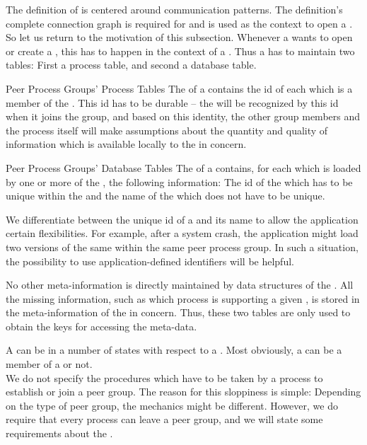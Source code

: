 \documentclass[a4paper, 12pt]{book}
\begin{document}
The definition of  is centered around communication
patterns. The definition's complete connection graph is required for
and is used as the context to open a . So let us return
to the motivation of this subsection. Whenever a  wants to
open or create a , this has to happen in the context of a
. Thus a  has to
maintain two tables: First a process table, and second a database
table.
%
\begin{definition*}{Peer Process Groups' Process Tables}
  The  of a  contains the id
  of each  which is a member of the . This id has to be durable -- the  will be
  recognized by this id when it joins the group, and based on this
  identity, the other group members and the process itself will make
  assumptions about the quantity and quality of information which
  is available locally to the  in concern.
\end{definition*}
%
\begin{definition*}{Peer Process Groups' Database Tables}
  The  of a  contains, for
  each  which is loaded by one or more  of
  the , the following information: The id of the
   which has to be unique within the  and the name of the  which does not have to be
  unique.
\end{definition*}
%
We differentiate between the unique id of a  and its name
to allow the application certain flexibilities. For example, after a
system crash, the application might load two versions of the same
 within the same peer process group. In such a
situation, the possibility to use application-defined identifiers will be
helpful.

No other meta-information is directly maintained by data structures of
the . All the missing information, such as
which process is supporting a given , is stored in the
meta-information of the  in concern. Thus, these two
tables are only used to obtain the keys for accessing the
meta-data.


A  can be in a number of states with respect to a . Most obviously, a  can be a member of a
 or not.\\
%
We do not specify the procedures which have to be taken by a process to
establish or join a peer group. The reason for this sloppiness is
simple: Depending on the type of peer group, the mechanics might be
different. However, we do require that every process can leave a peer
group, and we will state some requirements about the . 
\end{document}
